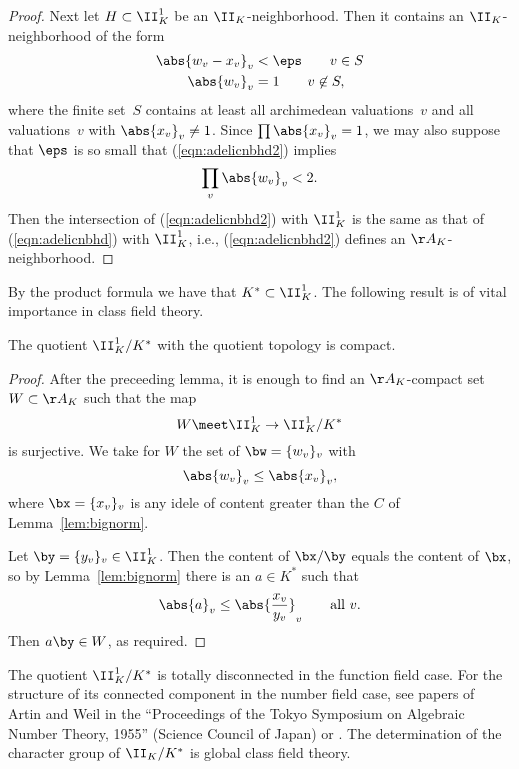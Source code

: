 \documentclass[11pt]{book}
\begin{document}
\begin{ch}
\begin{proof}
Next let $H\subset \II_K^1$ be an $\II_K$-neighborhood.  Then it contains
an $\II_K$-neighborhood of the form
\begin{align}\label{eqn:adelicnbhd2}
  \abs{w_v - x_v}_v &< \eps \qquad v\in S\\
  \abs{w_v}_v &= 1 \qquad v\not\in S,
\end{align}
where the finite set~$S$ contains at least all archimedean
valuations~$v$ and all valuations~$v$ with
$\abs{x_v}_v\neq 1$.  Since $\prod\abs{x_v}_v=1$, we may also
suppose that $\eps$ is so small that (\ref{eqn:adelicnbhd2})
implies
$$
  \prod_v\abs{w_v}_v < 2.
$$
Then the intersection of  (\ref{eqn:adelicnbhd2}) with
$\II_K^1$ is the same as that of  (\ref{eqn:adelicnbhd})
with $\II_K^1$, i.e.,  (\ref{eqn:adelicnbhd2})
defines an $\AA_K$-neighborhood.
\end{proof}

By the product formula we have that $K^*\subset \II_K^1$.
The following result is of vital importance in class
field theory.
\begin{theorem}\label{thm:compquo}
The quotient $\II_K^1/K^*$ with the quotient topology
is compact.
\end{theorem}
\begin{proof}
After the preceeding lemma, it is enough to find
an $\AA_K$-compact set $W\subset \AA_K$ such that the map
$$
  W\meet \II_K^1 \to \II_K^1/K^*
$$
is surjective.  We take for $W$ the set of
$\bw=\{w_v\}_v$ with
$$
  \abs{w_v}_v\leq \abs{x_v}_v,
$$
where $\bx=\{x_v\}_v$ is any idele of content greater than
the $C$ of Lemma~\ref{lem:bignorm}.

Let $\by=\{y_v\}_v\in \II_K^1$.  Then the content of $\bx/\by$ equals
the content of $\bx$, so by Lemma~\ref{lem:bignorm}
there is an $a\in K^*$ such that
$$
  \abs{a}_v \leq \abs{\frac{x_v}{y_v}}_v \qquad\text{all $v$}.
$$
Then $a\by\in W$, as required.
\end{proof}

\begin{remark}
  The quotient $\II_K^1/K^*$ is totally disconnected in the function
  field case.  For the structure of its connected component in the
  number field case, see papers of Artin and Weil in the ``Proceedings
  of the Tokyo Symposium on Algebraic Number Theory, 1955'' (Science
  Council of Japan) or \cite{artin-tate:cft}. The determination of the
  character group of $\II_K/K^*$ is global class field theory.
\end{remark}


\end{ch}
\end{document}
